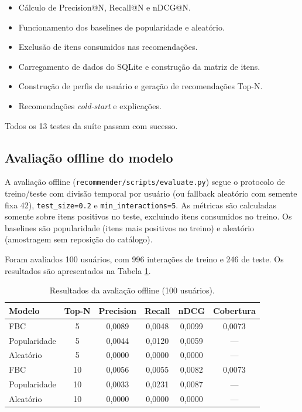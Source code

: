\documentclass[12pt,a4paper]{article}
\begin{document}
\begin{itemize}
    \item Cálculo de Precision@N, Recall@N e nDCG@N.
    \item Funcionamento dos baselines de popularidade e aleatório.
    \item Exclusão de itens consumidos nas recomendações.
    \item Carregamento de dados do SQLite e construção da matriz de itens.
    \item Construção de perfis de usuário e geração de recomendações Top-N.
    \item Recomendações \textit{cold-start} e explicações.
\end{itemize}

Todos os 13 testes da suíte passam com sucesso.

\subsection{Avaliação offline do modelo}

A avaliação offline (\texttt{recommender/scripts/evaluate.py}) segue o protocolo de treino/teste com divisão temporal por usuário (ou fallback aleatório com semente fixa 42), \texttt{test\_size=0.2} e \texttt{min\_interactions=5}. As métricas são calculadas somente sobre itens positivos no teste, excluindo itens consumidos no treino. Os baselines são popularidade (itens mais positivos no treino) e aleatório (amostragem sem reposição do catálogo).

Foram avaliados 100 usuários, com 996 interações de treino e 246 de teste. Os resultados são apresentados na Tabela \ref{tab:avaliacao}.

\begin{table}[H]
\centering
\caption{Resultados da avaliação offline (100 usuários).}
\label{tab:avaliacao}
\begin{tabular}{lccccc}
\toprule
Modelo & Top-N & Precision & Recall & nDCG & Cobertura \\
\midrule
FBC & 5 & 0,0089 & 0,0048 & 0,0099 & 0,0073 \\
Popularidade & 5 & 0,0044 & 0,0120 & 0,0059 & — \\
Aleatório & 5 & 0,0000 & 0,0000 & 0,0000 & — \\
\midrule
FBC & 10 & 0,0056 & 0,0055 & 0,0082 & 0,0073 \\
Popularidade & 10 & 0,0033 & 0,0231 & 0,0087 & — \\
Aleatório & 10 & 0,0000 & 0,0000 & 0,0000 & — \\
\bottomrule
\end{tabular}
\end{table}
\end{document}
